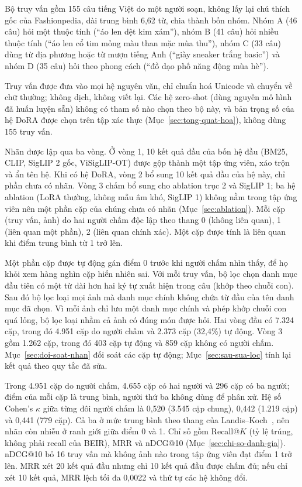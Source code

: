 Bộ truy vấn gồm 155 câu tiếng Việt do một người soạn, không lấy lại chú thích gốc của Fashionpedia, dài trung bình 6,62 từ, chia thành bốn nhóm. Nhóm A (46 câu) hỏi một thuộc tính (``áo len dệt kim xám''), nhóm B (41 câu) hỏi nhiều thuộc tính (``áo len cổ tim mỏng màu than mặc mùa thu''), nhóm C (33 câu) dùng từ địa phương hoặc từ mượn tiếng Anh (``giày sneaker trắng basic'') và nhóm D (35 câu) hỏi theo phong cách (``đồ dạo phố năng động mùa hè'').

Truy vấn được đưa vào mọi hệ nguyên văn, chỉ chuẩn hoá Unicode và chuyển về chữ thường; không dịch, không viết lại. Các hệ zero-shot (dùng nguyên mô hình đã huấn luyện sẵn) không có tham số nào chọn theo bộ này, và bản trọng số của hệ DoRA được chọn trên tập xác thực (Mục~\ref{sec:tong-quat-hoa}), không dùng 155 truy vấn.

Nhãn được lập qua ba vòng. Ở vòng 1, 10 kết quả đầu của bốn hệ đầu (BM25, CLIP, SigLIP 2 gốc, ViSigLIP-OT) được gộp thành một tập ứng viên, xáo trộn và ẩn tên hệ. Khi có hệ DoRA, vòng 2 bổ sung 10 kết quả đầu của hệ này, chỉ phần chưa có nhãn. Vòng 3 chấm bổ sung cho ablation trục 2 và SigLIP 1; ba hệ ablation (LoRA thường, không mẫu âm khó, SigLIP 1) không nằm trong tập ứng viên nên một phần cặp của chúng chưa có nhãn (Mục~\ref{sec:ablation}). Mỗi cặp (truy vấn, ảnh) do hai người chấm độc lập theo thang 0 (không liên quan), 1 (liên quan một phần), 2 (liên quan chính xác). Một cặp được tính là liên quan khi điểm trung bình từ 1 trở lên.

Một phần cặp được tự động gán điểm 0 trước khi người chấm nhìn thấy, để họ khỏi xem hàng nghìn cặp hiển nhiên sai. Với mỗi truy vấn, bộ lọc chọn danh mục đầu tiên có một từ dài hơn hai ký tự xuất hiện trong câu (khớp theo chuỗi con). Sau đó bộ lọc loại mọi ảnh mà danh mục chính không chứa từ đầu của tên danh mục đã chọn. Vì mỗi ảnh chỉ lưu một danh mục chính và phép khớp chuỗi con quá lỏng, bộ lọc loại nhầm cả ảnh có đúng món được hỏi. Hai vòng đầu có 7.324 cặp, trong đó 4.951 cặp do người chấm và 2.373 cặp (32,4\%) tự động. Vòng 3 gồm 1.262 cặp, trong đó 403 cặp tự động và 859 cặp không có người chấm. Mục~\ref{sec:doi-soat-nhan} đối soát các cặp tự động; Mục~\ref{sec:sau-sua-loc} tính lại kết quả theo quy tắc đã sửa.

Trong 4.951 cặp do người chấm, 4.655 cặp có hai người và 296 cặp có ba người; điểm của mỗi cặp là trung bình, người thứ ba không dùng để phân xử. Hệ số Cohen's $\kappa$ giữa từng đôi người chấm là 0,520 (3.545 cặp chung), 0,442 (1.219 cặp) và 0,441 (779 cặp). Cả ba ở mức trung bình theo thang của Landis--Koch~\cite{landis1977kappa}, nên nhãn còn nhiễu ở ranh giới giữa điểm 0 và 1. Chỉ số gồm Recall@$K$ (tỷ lệ trúng, không phải recall của BEIR), MRR và nDCG@10 (Mục~\ref{sec:chi-so-danh-gia}). nDCG@10 bỏ 16 truy vấn mà không ảnh nào trong tập ứng viên đạt điểm 1 trở lên. MRR xét 20 kết quả đầu nhưng chỉ 10 kết quả đầu được chấm đủ; nếu chỉ xét 10 kết quả, MRR lệch tối đa 0,0022 và thứ tự các hệ không đổi.

